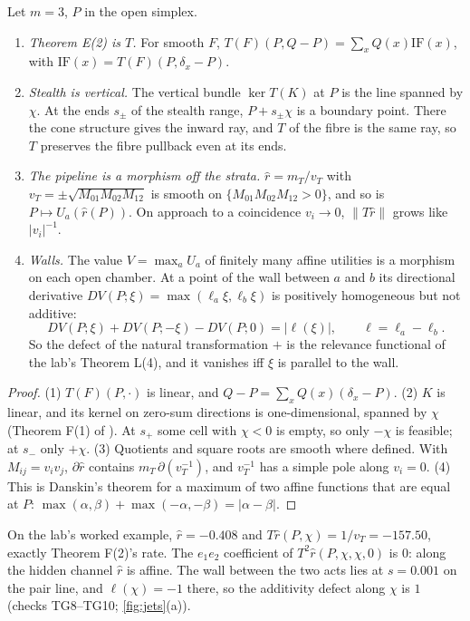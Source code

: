 \documentclass[11pt]{article}
\theoremstyle{definition}\newtheorem{definition}[theorem]{Definition}\newtheorem{remark}[theorem]{Remark}\newtheorem{example}[theorem]{Example}
\begin{document}
\begin{proposition}\label{prop:interior}
Let $m=3$, $P$ in the open simplex.
\begin{enumerate}
\item[(1)] \emph{Theorem E(2) is $T$.} For smooth $F$, $T(F)(P,Q-P)=\sum_xQ(x)\mathrm{IF}(x)$, with $\mathrm{IF}(x)=T(F)(P,\delta_x-P)$.
\item[(2)] \emph{Stealth is vertical.} The vertical bundle $\ker T(K)$ at $P$ is the line spanned by $\chi$. At the ends $s_\pm$ of
  the stealth range, $P+s_\pm\chi$ is a boundary point. There the cone structure gives the inward ray, and $T$ of the fibre is the same
  ray, so $T$ preserves the fibre pullback even at its ends.
\item[(3)] \emph{The pipeline is a morphism off the strata.} $\hat r=m_T/v_T$ with $v_T=\pm\sqrt{M_{01}M_{02}M_{12}}$ is smooth on
  $\{M_{01}M_{02}M_{12}>0\}$, and so is $P\mapsto U_a(\hat r(P))$. On approach to a coincidence $v_i\to0$, $\|T\hat r\|$ grows like
  $|v_i|^{-1}$.
\item[(4)] \emph{Walls.} The value $V=\max_aU_a$ of finitely many affine utilities is a morphism on each open chamber. At a point of the
  wall between $a$ and $b$ its directional derivative $DV(P;\xi)=\max(\ell_a\xi,\ell_b\xi)$ is positively homogeneous but not additive:
\[
DV(P;\xi)+DV(P;-\xi)-DV(P;0)=|\ell(\xi)|,\qquad \ell=\ell_a-\ell_b .
\]
  So the defect of the natural transformation $+$ is the relevance functional of the lab's Theorem L(4), and it vanishes iff $\xi$ is
  parallel to the wall.
\end{enumerate}
\end{proposition}

\begin{proof}
(1) $T(F)(P,\cdot)$ is linear, and $Q-P=\sum_xQ(x)(\delta_x-P)$. (2) $K$ is linear, and its kernel on zero-sum directions is one-dimensional,
spanned by $\chi$ (Theorem F(1) of \cite{Lab}). At $s_+$ some cell with $\chi<0$ is empty, so only $-\chi$ is feasible; at $s_-$
only $+\chi$. (3) Quotients and square roots are smooth where defined. With $M_{ij}=v_iv_j$, $\partial\hat r$ contains
$m_T\,\partial(v_T^{-1})$, and $v_T^{-1}$ has a simple pole along $v_i=0$. (4) This is Danskin's theorem \cite{Danskin1967} for a
maximum of two affine functions that are equal at $P$: $\max(\alpha,\beta)+\max(-\alpha,-\beta)=|\alpha-\beta|$.
\end{proof}

On the lab's worked example, $\hat r=-0.408$ and $T\hat r(P,\chi)=1/v_T=-157.50$, exactly Theorem F(2)'s rate. The $e_1e_2$ coefficient of
$T^2\hat r(P,\chi,\chi,0)$ is $0$: along the hidden channel $\hat r$ is affine. The wall between the two acts lies at $s=0.001$ on the pair
line, and $\ell(\chi)=-1$ there, so the additivity defect along $\chi$ is $1$ (checks TG8--TG10; \cref{fig:jets}(a)).
\end{document}
